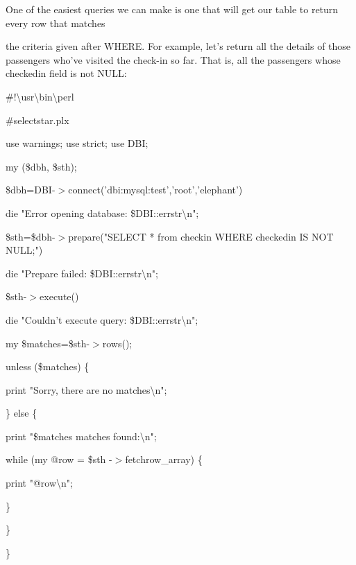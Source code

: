 \documentclass[a4paper,11pt]{book}
\begin{document}
\noindent 

\noindent One of the easiest queries we can make is one that will get our table to return every row that matches

\noindent the criteria given after WHERE. For example, let's return all the details of those passengers who've visited the check-in so far. That is, all the passengers whose checkedin field is not NULL:

\noindent 

\noindent \#!\textbackslash usr\textbackslash bin\textbackslash perl

\noindent \#selectstar.plx

\noindent 

\noindent use warnings; use strict; use DBI;

\noindent 

\noindent my (\$dbh, \$sth);

\noindent 

\noindent 

\noindent \$dbh=DBI-$>$connect('dbi:mysql:test','root','elephant') \textbar \textbar 

\noindent die "Error opening database: \$DBI::errstr\textbackslash n";

\noindent 

\noindent \$sth=\$dbh-$>$prepare("SELECT * from checkin WHERE checkedin IS NOT NULL;") \textbar \textbar 

\noindent die "Prepare failed: \$DBI::errstr\textbackslash n";

\noindent 

\noindent \$sth-$>$execute() \textbar \textbar 

\noindent die "Couldn't execute query: \$DBI::errstr\textbackslash n";

\noindent 

\noindent my \$matches=\$sth-$>$rows();

\noindent unless (\$matches) \{

\noindent print "Sorry, there are no matches\textbackslash n";

\noindent \} else \{

\noindent print "\$matches matches found:\textbackslash n";

\noindent while (my @row = \$sth -$>$fetchrow\_array) \{

\noindent print "@row\textbackslash n";

\noindent \}

\noindent \}

\noindent \}
\end{document}
